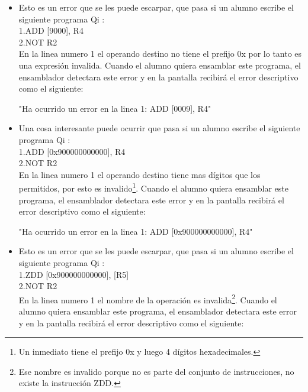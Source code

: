\begin{itemize}
"Ha ocurrido un error en la linea 2: NOT 0x0004" \\ 

\item Esto es un error que se les puede escarpar, que pasa si un alumno escribe el siguiente programa Qi :\\

1.ADD [9000], R4 \\
2.NOT R2 \\

En la linea numero 1 el operando destino no tiene el prefijo 0x por lo tanto es una expresión invalida. Cuando el alumno quiera ensamblar este programa, el ensamblador detectara este error y en la pantalla recibirá el error descriptivo como el siguiente:

"Ha ocurrido un error en la linea 1: ADD [0009], R4" \\ 

\item Una cosa interesante puede ocurrir que pasa si un alumno escribe el siguiente programa Qi :\\

1.ADD [0x900000000000], R4 \\
2.NOT R2 \\

En la linea numero 1 el operando destino tiene mas dígitos que los permitidos, por esto es invalido\footnote{Un inmediato tiene el prefijo 0x y luego 4 dígitos hexadecimales.}. Cuando el alumno quiera ensamblar este programa, el ensamblador detectara este error y en la pantalla recibirá el error descriptivo como el siguiente:

"Ha ocurrido un error en la linea 1: ADD [0x900000000000], R4" \\ 

\item Esto es un error que se les puede escarpar, que pasa si un alumno escribe el siguiente programa Qi  :\\

1.ZDD [0x900000000000], [R5] \\
2.NOT R2 \\

En la linea numero 1 el nombre de la operación es invalida\footnote{Ese nombre es invalido porque no es parte del conjunto de instrucciones, no existe la instrucción ZDD.}. Cuando el alumno quiera ensamblar este programa, el ensamblador detectara este error y en la pantalla recibirá el error descriptivo como el siguiente:


\end{itemize}
